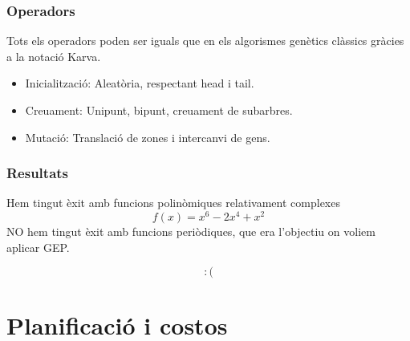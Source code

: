 \documentclass{beamer}
\begin{document}
\begin{frame}
	\frametitle{Operadors}
	Tots els operadors poden ser iguals que en els algorismes genètics clàssics
	gràcies a la notació Karva.
	\pause
	\begin{itemize}
		\item Inicialització: Aleatòria, respectant head i tail.
		\item Creuament: Unipunt, bipunt, creuament de subarbres.
		\item Mutació: Translació de zones i intercanvi de gens.
	\end{itemize}
\end{frame}

\begin{frame}
	\frametitle{Resultats}
	Hem tingut èxit amb funcions polinòmiques relativament complexes
	$$ f(x) = x^6 -2x^4 + x^2 $$
	\pause
	NO hem tingut èxit amb funcions periòdiques, que era l'objectiu on voliem
	aplicar GEP.

	$$ :( $$
\end{frame}

\section{Planificació i costos} %
\label{sec:Planificacio i costos}
\end{document}
